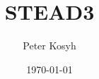 
\setmainlanguage{english}
\title{STEAD3}
\author{Peter Kosyh}
\date{\today}
\sloppy

\maketitle
{
\hypersetup{linkcolor=black}
\renewcommand{\contentsname}{Table of contents}
\tableofcontents
\clearpage
}


